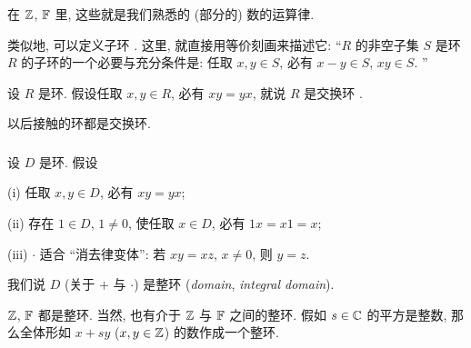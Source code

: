 \begin{example}
    在 $\mathbb{Z}$, $\mathbb{F}$ 里, 这些就是我们熟悉的 (部分的) 数的运算律.
\end{example}

\begin{remark}
    类似地, 可以定义子环 . 这里, 就直接用等价刻画来描述它: ``$R$ 的非空子集 $S$ 是环 $R$ 的子环的一个必要与充分条件是: 任取 $x,y \in S$, 必有 $x-y \in S$, $xy \in S$. ''
\end{remark}

\begin{definition}
    设 $R$ 是环. 假设任取 $x,y \in R$, 必有 $xy = yx$, 就说 $R$ 是交换环 .
\end{definition}

\begin{remark}
    以后接触的环都是交换环.
\end{remark}

\subsubsection*{\Domains}

\begin{definition}
    设 $D$ 是环. 假设

    (i) 任取 $x,y \in D$, 必有 $xy = yx$;

    (ii) 存在 $1 \in D$, $1 \neq 0$, 使任取 $x \in D$, 必有 $1x = x1 = x$;

    (iii) $\cdot$ 适合 ``消去律变体'': 若 $xy = xz$, $x \neq 0$, 则 $y = z$.

    我们说 $D$ (关于 $+$ 与 $\cdot$) 是整环 (\textit{domain}, \textit{integral domain}).
\end{definition}

\begin{example}
    $\mathbb{Z}$, $\mathbb{F}$ 都是整环. 当然, 也有介于 $\mathbb{Z}$ 与 $\mathbb{F}$ 之间的整环. 假如 $s \in \mathbb{C}$ 的平方是整数, 那么全体形如 $x + sy$ ($x,y \in \mathbb{Z}$) 的数作成一个整环.
\end{example}

